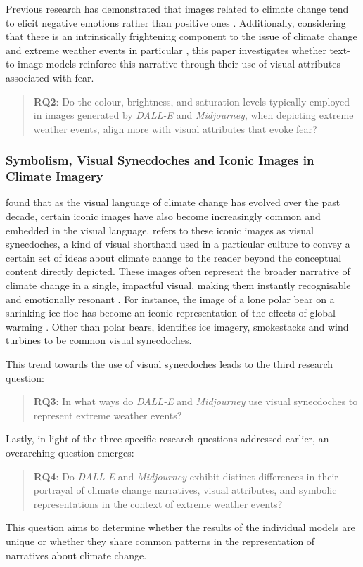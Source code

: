Previous research has demonstrated that images related to climate change tend to elicit negative emotions rather than positive ones \parencite{ONeill2017}. Additionally, considering that there is an intrinsically frightening component to the issue of climate change and extreme weather events in particular \parencite{Soutar2022}, this paper investigates whether text-to-image models reinforce this narrative through their use of visual attributes associated with fear.
\begin{quote}
\textbf{RQ2}: Do the colour, brightness, and saturation levels typically employed in images generated by \textit{DALL-E} and \textit{Midjourney}, when depicting extreme weather events, align more with visual attributes that evoke fear? 
\end{quote}
\subsubsection{Symbolism, Visual Synecdoches and Iconic Images in Climate Imagery}

\textcite[16]{ONeill2019} found that as the visual language of climate change has evolved over the past decade, certain iconic images have also become increasingly common and embedded in the visual language. \textcite[17]{ONeill2019} refers to these iconic images as visual synecdoches, a kind of visual shorthand used in a particular culture to convey a certain set of ideas about climate change  to the reader beyond the conceptual content directly depicted. These images often represent the broader narrative of climate change in a single, impactful visual, making them instantly recognisable and emotionally resonant \parencite[78]{ONeill2014}. For instance, the image of a lone polar bear on a shrinking ice floe has become an iconic representation of the effects of global warming \parencite[18]{ONeill2019}. Other than polar bears, \textcite[16]{ONeill2019} identifies ice imagery, smokestacks and wind turbines to be common visual synecdoches.

This trend towards the use of visual synecdoches leads to the third research question:
 \begin{quote}
\textbf{RQ3}: In what ways do \textit{DALL-E} and \textit{Midjourney} use visual synecdoches to represent extreme weather events?

 \end{quote}

Lastly, in light of the three specific research questions addressed earlier, an overarching question emerges:

\begin{quote}
\textbf{RQ4}: Do \textit{DALL-E} and \textit{Midjourney} exhibit distinct differences in their portrayal of climate change narratives, visual attributes, and symbolic representations in the context of extreme weather events?
\end{quote}

This question aims to determine whether the results of the individual models are unique or whether they share common patterns in the representation of narratives about climate change.





